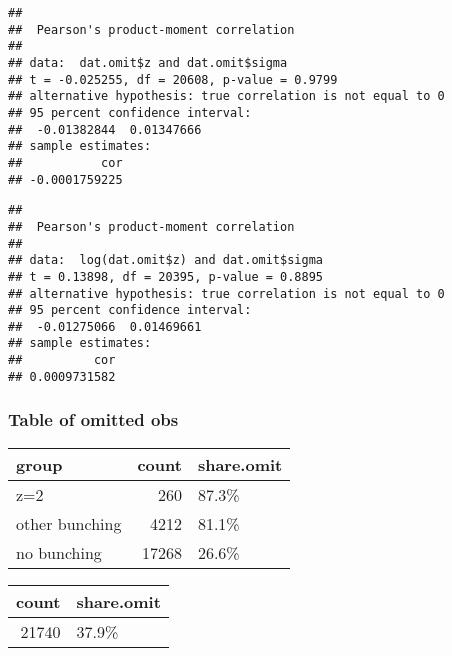 \documentclass[
]{article}
\newenvironment{Shaded}{\begin{snugshade}}{\end{snugshade}}
\newcommand{\DecValTok}[1]{\textcolor[rgb]{0.00,0.00,0.81}{#1}}
\newcommand{\FunctionTok}[1]{\textcolor[rgb]{0.00,0.00,0.00}{#1}}
\newcommand{\NormalTok}[1]{#1}
\newcommand{\OtherTok}[1]{\textcolor[rgb]{0.56,0.35,0.01}{#1}}
\newcommand{\SpecialCharTok}[1]{\textcolor[rgb]{0.00,0.00,0.00}{#1}}
\begin{document}
\begin{verbatim}
## 
##  Pearson's product-moment correlation
## 
## data:  dat.omit$z and dat.omit$sigma
## t = -0.025255, df = 20608, p-value = 0.9799
## alternative hypothesis: true correlation is not equal to 0
## 95 percent confidence interval:
##  -0.01382844  0.01347666
## sample estimates:
##           cor 
## -0.0001759225
\end{verbatim}

\begin{Shaded}
\end{Shaded}

\begin{verbatim}
## 
##  Pearson's product-moment correlation
## 
## data:  log(dat.omit$z) and dat.omit$sigma
## t = 0.13898, df = 20395, p-value = 0.8895
## alternative hypothesis: true correlation is not equal to 0
## 95 percent confidence interval:
##  -0.01275066  0.01469661
## sample estimates:
##          cor 
## 0.0009731582
\end{verbatim}

\hypertarget{table-of-omitted-obs}{%
\subsubsection{Table of omitted obs}\label{table-of-omitted-obs}}

\begin{longtable}[]{@{}lrl@{}}
\toprule
group & count & share.omit \\
\midrule
\endhead
z=2 & 260 & 87.3\% \\
other bunching & 4212 & 81.1\% \\
no bunching & 17268 & 26.6\% \\
\bottomrule
\end{longtable}

\begin{longtable}[]{@{}rl@{}}
\toprule
count & share.omit \\
\midrule
\endhead
21740 & 37.9\% \\
\bottomrule
\end{longtable}
\end{document}
